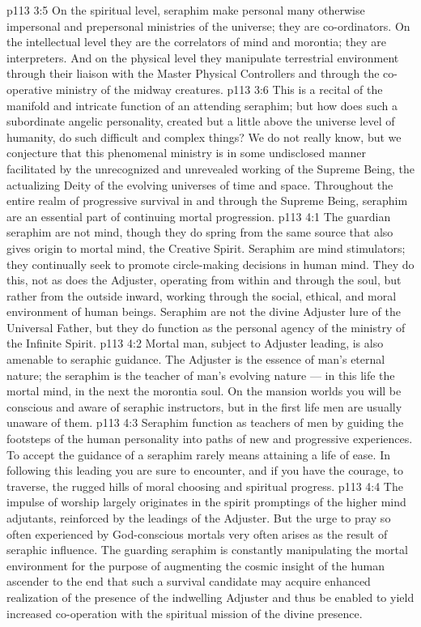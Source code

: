 \vs p113 3:5 On the spiritual level, seraphim make personal many otherwise impersonal and prepersonal ministries of the universe; they are co\hyp{}ordinators. On the intellectual level they are the correlators of mind and morontia; they are interpreters. And on the physical level they manipulate terrestrial environment through their liaison with the Master Physical Controllers and through the co\hyp{}operative ministry of the midway creatures.
\vs p113 3:6 This is a recital of the manifold and intricate function of an attending seraphim; but how does such a subordinate angelic personality, created but a little above the universe level of humanity, do such difficult and complex things? We do not really know, but we conjecture that this phenomenal ministry is in some undisclosed manner facilitated by the unrecognized and unrevealed working of the Supreme Being, the actualizing Deity of the evolving universes of time and space. Throughout the entire realm of progressive survival in and through the Supreme Being, seraphim are an essential part of continuing mortal progression.
\vs p113 4:1 The guardian seraphim are not mind, though they do spring from the same source that also gives origin to mortal mind, the Creative Spirit. Seraphim are mind stimulators; they continually seek to promote circle\hyp{}making decisions in human mind. They do this, not as does the Adjuster, operating from within and through the soul, but rather from the outside inward, working through the social, ethical, and moral environment of human beings. Seraphim are not the divine Adjuster lure of the Universal Father, but they do function as the personal agency of the ministry of the Infinite Spirit.
\vs p113 4:2 Mortal man, subject to Adjuster leading, is also amenable to seraphic guidance. The Adjuster is the essence of man’s eternal nature; the seraphim is the teacher of man’s evolving nature --- in this life the mortal mind, in the next the morontia soul. On the mansion worlds you will be conscious and aware of seraphic instructors, but in the first life men are usually unaware of them.
\vs p113 4:3 Seraphim function as teachers of men by guiding the footsteps of the human personality into paths of new and progressive experiences. To accept the guidance of a seraphim rarely means attaining a life of ease. In following this leading you are sure to encounter, and if you have the courage, to traverse, the rugged hills of moral choosing and spiritual progress.
\vs p113 4:4 The impulse of worship largely originates in the spirit promptings of the higher mind adjutants, reinforced by the leadings of the Adjuster. But the urge to pray so often experienced by God\hyp{}conscious mortals very often arises as the result of seraphic influence. The guarding seraphim is constantly manipulating the mortal environment for the purpose of augmenting the cosmic insight of the human ascender to the end that such a survival candidate may acquire enhanced realization of the presence of the indwelling Adjuster and thus be enabled to yield increased co\hyp{}operation with the spiritual mission of the divine presence.
